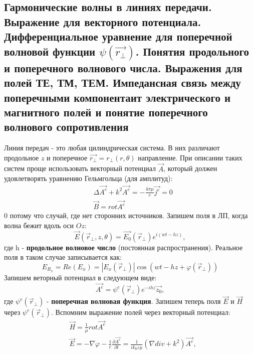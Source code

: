 
\subsection{Гармонические волны в линиях передачи. Выражение для векторного потенциала. Дифференциальное уравнение для
поперечной волновой функции $\psi(\vec{r_{\perp}})$. Понятия продольного и поперечного волнового числа. Выражения для
полей ТЕ, ТМ, ТЕМ. Импедансная связь между поперечными компонентаит электрического и магнитного полей и понятие
поперечного волнового сопротивления}

Линия передач - это любая цилиндрическая система. В них различают продольное $z$ и поперечное $\vec{r_{\perp}} = r_{\perp}(r,\theta)$ направление. При описании
таких систем проще использовать векторный потенциал $\vec{A}$, который должен удовлетворять уравнению Гельмгольца (для амплитуд):
\begin{align*}
  &\Delta \vec{A^e} + k^2 \vec{A^e} = -\frac{4 \pi \mu}{c} \vec{j^e}  =0 \\
  &\vec{B} = rot \vec{A^e}
  \label{eq:1}
\end{align*}
0 потому что случай, где нет сторонних источников. Запишем поля в ЛП, когда волна бежит вдоль оси $Oz$:
\begin{equation}
  \vec{E}(\vec{r}_{\perp},z,\theta) = \vec{E_0}(\vec{r}_{\perp}) e^{i(wt-hz)},
  \label{eq:2}
\end{equation}
где h - \textbf{продольное волновое число} (постоянная распространения). Реальное поля в таком случае записывается как:
\begin{equation}
  E_{R_x} = Re(E_x) = |E_x(\vec{r}_{\perp})|\cos (wt-hz + \varphi(\vec{r}_{\perp}))
  \label{eq:3}
\end{equation}
Запишем веторный потенциал в следующем виде:
\begin{equation}
  \vec{A^e} = \psi^e(\vec{r}_{\perp})e^{-ihz}\vec{z_0},
  \label{eq:4}
\end{equation}
где $\psi^e(\vec{r}_{\perp})$ - \textbf{поперечная волновая функция}. Запишем теперь поля $\vec{E}$ и $\vec{H}$ через
$\psi^e(\vec{r}_{\perp})$. Вспомним выражение полей через векторный потенциал:
\begin{align*}
  &\vec{H} = \frac{1}{\mu}rot \vec{A^e}\\
  &\vec{E} = -\nabla \varphi - \frac{1}{c}\frac{\partial\vec{A^e}}{\partial t} = \frac{1}{ik_0\varepsilon\mu}(\nabla div + k^2)\vec{A^e},
  \label{eq:5}
\end{align*} 
